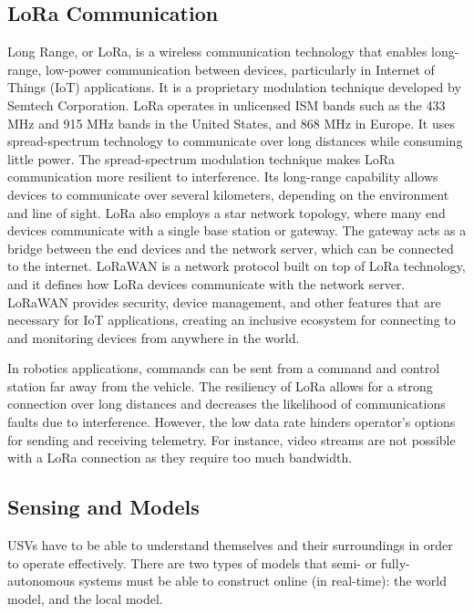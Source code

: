 \documentclass[12pt]{article}
\begin{document}
\subsection{LoRa Communication} %

Long Range, or LoRa, is a wireless communication technology that enables long-range, low-power communication between devices, particularly in Internet of Things (IoT) applications. 
It is a proprietary modulation technique developed by Semtech Corporation. 
LoRa operates in unlicensed ISM bands such as the 433 MHz and 915 MHz bands in the United States, and 868 MHz in Europe.
It uses spread-spectrum technology to communicate over long distances while consuming little power. 
The spread-spectrum modulation technique makes LoRa communication more resilient to interference. 
Its long-range capability allows devices to communicate over several kilometers, depending on the environment and line of sight. 
LoRa also employs a star network topology, where many end devices communicate with a single base station or gateway. 
The gateway acts as a bridge between the end devices and the network server, which can be connected to the internet. 
LoRaWAN is a network protocol built on top of LoRa technology, and it defines how LoRa devices communicate with the network server. 
LoRaWAN provides security, device management, and other features that are necessary for IoT applications, creating an inclusive ecosystem for connecting to and monitoring devices from anywhere in the world.

In robotics applications, commands can be sent from a command and control station far away from the vehicle.
The resiliency of LoRa allows for a strong connection over long distances and decreases the likelihood of communications faults due to interference.
However, the low data rate hinders operator's options for sending and receiving telemetry.
For instance, video streams are not possible with a LoRa connection as they require too much bandwidth.

\subsection{Sensing and Models}
    USVs have to be able to understand themselves and their surroundings in order to operate effectively.
    There are two types of models that semi- or fully-autonomous systems must be able to construct online (in real-time): the world model, and the local model.
    
\end{document}
